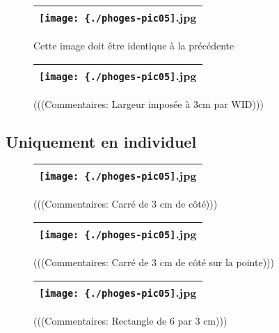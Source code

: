 \documentclass[12pt,twocolumn,french]{article}
\begin{document}
  \begin{figure}[H]
    \label{phoges-pic05.jpg}
    \noindent \centering{}
    \begin{tabular}{|c|}
      \hline
          \texttt{[image: \{./phoges-pic05]}.jpg}
        \tabularnewline \hline
    \end{tabular}
    \vspace{2mm}
    \caption{
      Cette image doit être identique à la précédente
    }
  \end{figure}
  \begin{figure}[H]
    \label{phoges-pic05.jpg}
    \noindent \centering{}
    \begin{tabular}{|c|}
      \hline
          \texttt{[image: \{./phoges-pic05]}.jpg}
        \tabularnewline \hline
    \end{tabular}
    \vspace{2mm}
    \caption{
      (((Commentaires: Largeur imposée à 3cm par WID)))
    }
  \end{figure}
%
\subsection{Uniquement en individuel}
%
  \begin{figure}[H]
    \label{phoges-pic05.jpg}
    \noindent \centering{}
    \begin{tabular}{|c|}
      \hline
          \texttt{[image: \{./phoges-pic05]}.jpg}
        \tabularnewline \hline
    \end{tabular}
    \vspace{2mm}
    \caption{
      (((Commentaires: Carré de 3 cm de côté)))
    }
  \end{figure}
  \begin{figure}[H]
    \label{phoges-pic05.jpg}
    \noindent \centering{}
    \begin{tabular}{|c|}
      \hline
          \texttt{[image: \{./phoges-pic05]}.jpg}
        \tabularnewline \hline
    \end{tabular}
    \vspace{2mm}
    \caption{
      (((Commentaires: Carré de 3 cm de côté sur la pointe)))
    }
  \end{figure}
  \begin{figure}[H]
    \label{phoges-pic05.jpg}
    \noindent \centering{}
    \begin{tabular}{|c|}
      \hline
          \texttt{[image: \{./phoges-pic05]}.jpg}
        \tabularnewline \hline
    \end{tabular}
    \vspace{2mm}
    \caption{
      (((Commentaires: Rectangle de 6 par 3 cm)))
    }
  \end{figure}
%
\end{document}
